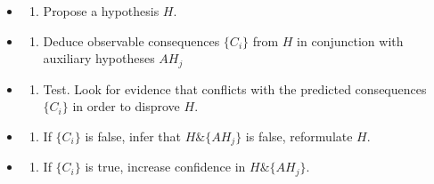 \documentclass[
]{book}
\providecommand{\tightlist}{%
  \setlength{\itemsep}{0pt}\setlength{\parskip}{0pt}}
\begin{document}
\begin{itemize}
\item
  \begin{enumerate}
  \def\labelenumi{\arabic{enumi}.}
  \tightlist
  \item
    Propose a hypothesis \(H\).
  \end{enumerate}
\item
  \begin{enumerate}
  \def\labelenumi{\arabic{enumi}.}
  \setcounter{enumi}{1}
  \tightlist
  \item
    Deduce observable consequences \(\{C_i\}\) from \(H\) in conjunction with auxiliary hypotheses \({AH_j}\)
  \end{enumerate}
\item
  \begin{enumerate}
  \def\labelenumi{\arabic{enumi}.}
  \setcounter{enumi}{2}
  \tightlist
  \item
    Test. Look for evidence that conflicts with the predicted consequences \(\{C_i\}\) in order to disprove \(H\).
  \end{enumerate}
\item
  \begin{enumerate}
  \def\labelenumi{\arabic{enumi}.}
  \setcounter{enumi}{3}
  \tightlist
  \item
    If \(\{C_i\}\) is false, infer that \(H \& \{AH_j\}\) is false, reformulate \(H\).
  \end{enumerate}
\item
  \begin{enumerate}
  \def\labelenumi{\arabic{enumi}.}
  \setcounter{enumi}{4}
  \tightlist
  \item
    If \(\{C_i\}\) is true, increase confidence in \(H \& \{AH_j\}\).
  \end{enumerate}
\end{itemize}
\end{document}
